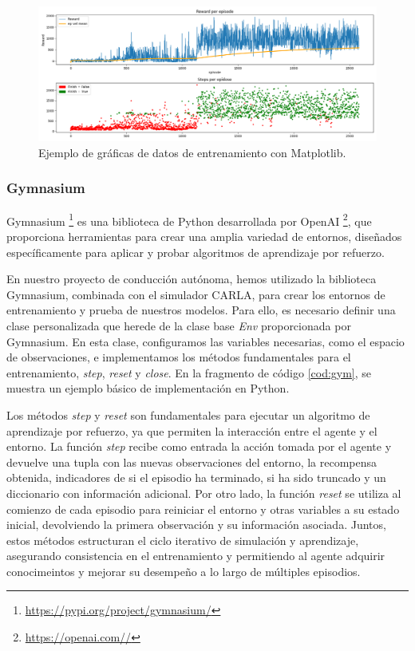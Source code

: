\begin{figure}[ht]
  \begin{center}
    \includegraphics[width=12cm]{figs/Plataformas_Desarollo/plot.png}
  \end{center}
  \caption{Ejemplo de gráficas de datos de entrenamiento con Matplotlib.}
  \label{foto_plot}
\end{figure}

\subsubsection{Gymnasium}
\label{sec:gymnasium}

Gymnasium \footnote{\url{https://pypi.org/project/gymnasium/}} es una biblioteca de Python desarrollada por OpenAI \footnote{\url{https://openai.com//}}, que proporciona herramientas para crear una amplia variedad de entornos, diseñados específicamente para aplicar y probar algoritmos de aprendizaje por refuerzo.

En nuestro proyecto de conducción autónoma, hemos utilizado la biblioteca Gymnasium, combinada con el simulador CARLA, para crear los entornos de entrenamiento y prueba de nuestros modelos. Para ello, es necesario definir una clase personalizada que herede de la clase base \textit{Env} proporcionada por Gymnasium. En esta clase, configuramos las variables necesarias, como el espacio de observaciones, e implementamos los métodos fundamentales para el entrenamiento, \textit{step}, \textit{reset} y \textit{close}. En la fragmento de código \ref{cod:gym}, se muestra un ejemplo básico de implementación en Python.

Los métodos \textit{step} y \textit{reset} son fundamentales para ejecutar un algoritmo de aprendizaje por refuerzo, ya que permiten la interacción entre el agente y el entorno. La función \textit{step} recibe como entrada la acción tomada por el agente y devuelve una tupla con las nuevas observaciones del entorno, la recompensa obtenida, indicadores de si el episodio ha terminado, si ha sido truncado y un diccionario con información adicional. Por otro lado, la función \textit{reset} se utiliza al comienzo de cada episodio para reiniciar el entorno y otras variables a su estado inicial, devolviendo la primera observación y su información asociada. Juntos, estos métodos estructuran el ciclo iterativo de simulación y aprendizaje, asegurando consistencia en el entrenamiento y permitiendo al agente adquirir conocimeintos y mejorar su desempeño a lo largo de múltiples episodios.

